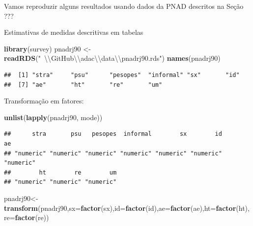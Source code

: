 \documentclass[]{book}
\newenvironment{Shaded}{\begin{snugshade}}{\end{snugshade}}
\newcommand{\KeywordTok}[1]{\textcolor[rgb]{0.13,0.29,0.53}{\textbf{{#1}}}}
\newcommand{\DataTypeTok}[1]{\textcolor[rgb]{0.13,0.29,0.53}{{#1}}}
\newcommand{\CharTok}[1]{\textcolor[rgb]{0.31,0.60,0.02}{{#1}}}
\newcommand{\StringTok}[1]{\textcolor[rgb]{0.31,0.60,0.02}{{#1}}}
\newcommand{\NormalTok}[1]{{#1}}
\numberwithin{example}{chapter}
\numberwithin{remark}{chapter}
\numberwithin{definition}{chapter}
\let\BeginKnitrBlock\begin \let\EndKnitrBlock\end
\begin{document}
Vamos reproduzir alguns resultados usando dados da PNAD descritos na
Seção ???

\BeginKnitrBlock{example}
\protect\hypertarget{ex:unnamed-chunk-125}{}{\label{ex:unnamed-chunk-125}}Estimativas
de medidas descritivas em tabelas
\EndKnitrBlock{example}

\begin{Shaded}
\begin{Highlighting}[]
\KeywordTok{library}\NormalTok{(survey)}
\NormalTok{pnadrj90 <-}\StringTok{ }\KeywordTok{readRDS}\NormalTok{(}\StringTok{"~}\CharTok{\textbackslash{}\textbackslash{}}\StringTok{GitHub}\CharTok{\textbackslash{}\textbackslash{}}\StringTok{adac}\CharTok{\textbackslash{}\textbackslash{}}\StringTok{data}\CharTok{\textbackslash{}\textbackslash{}}\StringTok{pnadrj90.rds"}\NormalTok{)}
\KeywordTok{names}\NormalTok{(pnadrj90)}
\end{Highlighting}
\end{Shaded}

\begin{verbatim}
##  [1] "stra"     "psu"      "pesopes"  "informal" "sx"       "id"      
##  [7] "ae"       "ht"       "re"       "um"
\end{verbatim}

Transformação em fatores:

\begin{Shaded}
\begin{Highlighting}[]
\KeywordTok{unlist}\NormalTok{(}\KeywordTok{lapply}\NormalTok{(pnadrj90, mode))}
\end{Highlighting}
\end{Shaded}

\begin{verbatim}
##      stra       psu   pesopes  informal        sx        id        ae 
## "numeric" "numeric" "numeric" "numeric" "numeric" "numeric" "numeric" 
##        ht        re        um 
## "numeric" "numeric" "numeric"
\end{verbatim}

\begin{Shaded}
\begin{Highlighting}[]
\NormalTok{pnadrj90<-}\KeywordTok{transform}\NormalTok{(pnadrj90,}\DataTypeTok{sx=}\KeywordTok{factor}\NormalTok{(sx),}\DataTypeTok{id=}\KeywordTok{factor}\NormalTok{(id),}\DataTypeTok{ae=}\KeywordTok{factor}\NormalTok{(ae),}\DataTypeTok{ht=}\KeywordTok{factor}\NormalTok{(ht),}\DataTypeTok{re=}\KeywordTok{factor}\NormalTok{(re))}
\end{Highlighting}
\end{Shaded}
\end{document}
